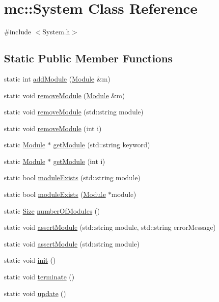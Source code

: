 \hypertarget{classmc_1_1_system}{}\section{mc\+:\+:System Class Reference}
\label{classmc_1_1_system}


{\ttfamily \#include $<$System.\+h$>$}

\subsection*{Static Public Member Functions}
\begin{DoxyCompactItemize}
\item 
static int \hyperlink{classmc_1_1_system_a21a8af9fa9f4a2699478967cbb6949ee}{add\+Module} (\hyperlink{classmc_1_1_module}{Module} \&m)
\item 
static void \hyperlink{classmc_1_1_system_ab37f8cd571040772e73a07584f8b0dba}{remove\+Module} (\hyperlink{classmc_1_1_module}{Module} \&m)
\item 
static void \hyperlink{classmc_1_1_system_a08969e2d1572536469827e7b44e904f9}{remove\+Module} (std\+::string module)
\item 
static void \hyperlink{classmc_1_1_system_aed18cf4077fa7c71432197597b190508}{remove\+Module} (int i)
\item 
static \hyperlink{classmc_1_1_module}{Module} $\ast$ \hyperlink{classmc_1_1_system_afb983a07b501764541c47a773e6044c8}{get\+Module} (std\+::string keyword)
\item 
static \hyperlink{classmc_1_1_module}{Module} $\ast$ \hyperlink{classmc_1_1_system_ad5f68cf3d76b080e10684a4a82e06abd}{get\+Module} (int i)
\item 
static bool \hyperlink{classmc_1_1_system_a8d33e21ec54da4940e14e7d1eb1a522b}{module\+Exists} (std\+::string module)
\item 
static bool \hyperlink{classmc_1_1_system_a16b15b813b7eb7dfbb84845bb4568f94}{module\+Exists} (\hyperlink{classmc_1_1_module}{Module} $\ast$module)
\item 
static \hyperlink{namespacemc_ad1c06461067735b3b17e0df612532c4e}{Size} \hyperlink{classmc_1_1_system_adf3dad3de5f7b16ccae9fd980ed2bcaf}{number\+Of\+Modules} ()
\item 
static void \hyperlink{classmc_1_1_system_aa8164cbb910ce94ba763e7033ade380f}{assert\+Module} (std\+::string module, std\+::string error\+Message)
\item 
static void \hyperlink{classmc_1_1_system_ae1828bcb4d2661c51e164ef986205a2c}{assert\+Module} (std\+::string module)
\item 
static void \hyperlink{classmc_1_1_system_a86b7559895967af432c5c3db728bd0bc}{init} ()
\item 
static void \hyperlink{classmc_1_1_system_a37d9b4e42bc96bddf835abd0bf3176bd}{terminate} ()
\item 
static void \hyperlink{classmc_1_1_system_a90e14e44eb5a6019c913a6a197deb4a0}{update} ()
\end{DoxyCompactItemize}


